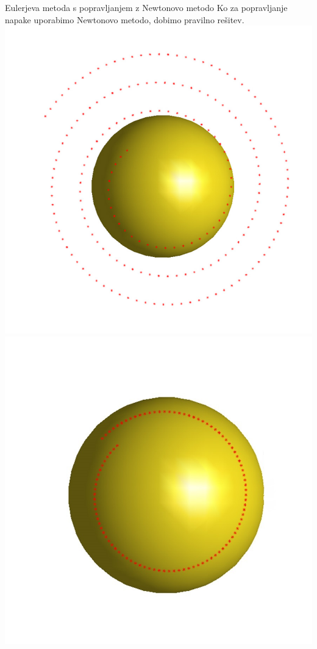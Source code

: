 \documentclass{beamer}
\begin{document}
	\begin{frame}{Eulerjeva metoda s popravljanjem z Newtonovo metodo}
		Ko za popravljanje napake uporabimo Newtonovo metodo, dobimo pravilno rešitev.
		\includegraphics[scale=0.2]{eul2}
		\includegraphics[scale=0.2]{eul1}

\end{frame}
\end{document}

